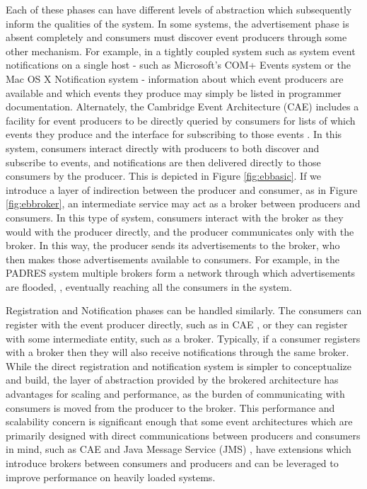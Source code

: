 \documentclass{acm_proc_article-sp}
\begin{document}
Each of these phases can have different levels of abstraction which subsequently inform the qualities of the system. In some systems, the advertisement phase is absent completely and consumers must discover event producers through some other mechanism. For example, in a tightly coupled system such as system event notifications on a single host - such as Microsoft's COM+ Events system or the Mac OS X Notification system - information about which event producers are available and which events they produce may simply be listed in programmer documentation. Alternately, the Cambridge Event Architecture (CAE) includes a facility for event producers to be directly queried by consumers for lists of which events they produce and the interface for subscribing to those events \cite{Bacon:2000p6818}. In this system, consumers interact directly with producers to both discover and subscribe to events, and notifications are then delivered directly to those consumers by the producer. This is depicted in Figure \ref{fig:ebbasic}. If we introduce a layer of indirection between the producer and consumer, as in Figure \ref{fig:ebbroker}, an intermediate service may act as a broker between producers and consumers. In this type of system, consumers interact with the broker as they would with the producer directly, and the producer communicates only with the broker. In this way, the producer sends its advertisements to the broker, who then makes those advertisements available to consumers. For example, in the PADRES system multiple brokers form a network through which advertisements are flooded, \cite{Jacobsen:2010p8313}, eventually reaching all the consumers in the system.

Registration and Notification phases can be handled similarly. The consumers can register with the event producer directly, such as in CAE \cite{Bacon:2000p6818}, or they can register with some intermediate entity, such as a broker. Typically, if a consumer registers with a broker then they will also receive notifications through the same broker. While the direct registration and notification system is simpler to conceptualize and build, the layer of abstraction provided by the brokered architecture has advantages for scaling and performance, as the burden of communicating with consumers is moved from the producer to the broker. This performance and scalability concern is significant enough that some event architectures which are primarily designed with direct communications between producers and consumers in mind, such as CAE \cite{Bacon:2000p6818} and Java Message Service (JMS) \cite{Oracle:2002p8432}, have extensions which introduce brokers between consumers and producers and can be leveraged to improve performance on heavily loaded systems.
\end{document}
